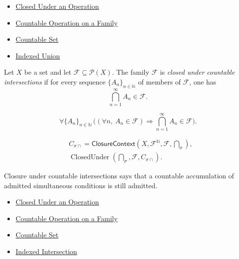 \begin{dependencies}
\begin{itemize}
  \item \hyperref[def:closed-under-operation]{Closed Under an Operation}
  \item \hyperref[def:countable-operation-on-family]{Countable Operation on a Family}
  \item \hyperref[def:countable]{Countable Set}
  \item \hyperref[def:indexed-union]{Indexed Union}
\end{itemize}
\end{dependencies}

\begin{definition}\label{def:closed-under-countable-intersections}
Let \(X\) be a set and let \(\mathcal{F}\subseteq\mathcal{P}(X)\).  The family
\(\mathcal{F}\) is \emph{closed under countable intersections} if for every
sequence \(\{A_n\}_{n\in\mathbb{N}}\) of members of \(\mathcal{F}\), one has
\[
  \bigcap_{n=1}^{\infty} A_n \in \mathcal{F}.
\]
\end{definition}

\begin{remark*}
\[
  \forall \{A_n\}_{n\in\mathbb{N}}\,
  \bigl((\forall n,\ A_n\in\mathcal{F})
  \Rightarrow
  \bigcap_{n=1}^{\infty}A_n\in\mathcal{F}\bigr).
\]
\end{remark*}

\begin{remark*}
\[
\begin{aligned}
&C_{\sigma\cap}
=\mathsf{ClosureContext}(X,\mathcal{F}^{\mathbb{N}},\mathcal{F},\bigcap_{\sigma}),\\
&\operatorname{ClosedUnder}(\bigcap_{\sigma},\mathcal{F},C_{\sigma\cap}).
\end{aligned}
\]
\end{remark*}

\begin{remark*}[Interpretation]
Closure under countable intersections says that a countable accumulation of
admitted simultaneous conditions is still admitted.
\end{remark*}

\begin{dependencies}
\begin{itemize}
  \item \hyperref[def:closed-under-operation]{Closed Under an Operation}
  \item \hyperref[def:countable-operation-on-family]{Countable Operation on a Family}
  \item \hyperref[def:countable]{Countable Set}
  \item \hyperref[def:indexed-intersection]{Indexed Intersection}
\end{itemize}
\end{dependencies}
